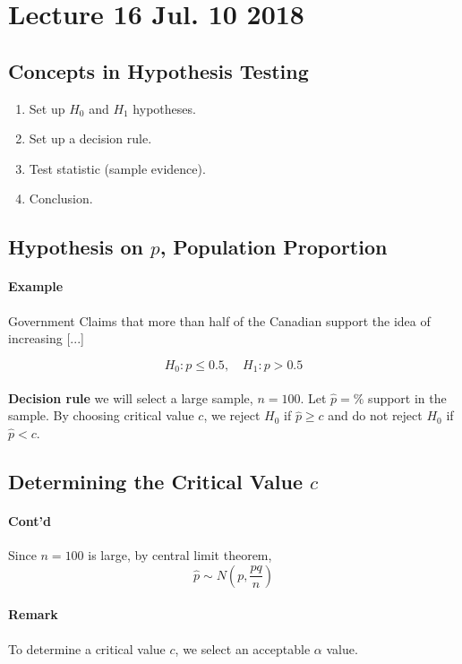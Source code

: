 \documentclass{article}
\begin{document}
				
	\section{Lecture 16 Jul. 10 2018}
		\subsection{Concepts in Hypothesis Testing}
			\begin{enumerate}
				\item Set up $H_0$ and $H_1$ hypotheses.
				\item Set up a decision rule.
				\item Test statistic (sample evidence).
				\item Conclusion.
			\end{enumerate}
			
		\subsection{Hypothesis on $p$, Population Proportion}
			\paragraph{Example} Government Claims that more than half of the Canadian support the idea of increasing [...]
			
			\[
				H_0: p \leq 0.5,\quad 
				H_1: p > 0.5
			\]
			\\
			\textbf{Decision rule} we will select a large sample, $n=100$. Let $\hat{p} = \%$ support in the sample. By choosing critical value $c$, we reject $H_0$ if $\hat{p} \geq c$ and do not reject $H_0$ if $\hat{p} < c$.
		
		\subsection{Determining the Critical Value $c$}
			\paragraph{Cont'd} Since $n=100$ is large, by central limit theorem,
				\[
					\hat{p} \sim N(p, \frac{pq}{n})
				\]
			\paragraph{Remark} To determine a critical value $c$, we select an acceptable $\alpha$ value.
			
\end{document}
